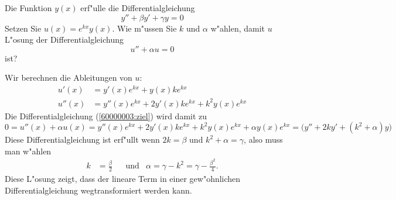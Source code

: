 Die Funktion $y(x)$ erf"ulle die Differentialgleichung
\begin{equation}
y''+\beta y' + \gamma y=0
\label{60000003:vorgabe}
\end{equation}
Setzen Sie $u(x)=e^{k x}y(x)$.
Wie m"ussen Sie $k$ und $\alpha$ w"ahlen, damit $u$ L"osung der
Differentialgleichung
\begin{equation}
u''+\alpha u=0
\label{60000003:ziel}
\end{equation}
ist?

\begin{loesung}
Wir berechnen die Ableitungen von $u$:
\begin{align*}
u'(x)&=y'(x)e^{kx}+y(x)ke^{kx}\\
u''(x)&=y''(x)e^{kx}+2y'(x)ke^{kx}+k^2y(x)e^{kx}
\end{align*}
Die Differentialgleichung  (\ref{60000003:ziel}) wird damit
zu
\[
0
=
u''(x)+\alpha u(x)
=
y''(x)e^{kx}+2y'(x)ke^{kx}+k^2y(x)e^{kx}
+ \alpha y(x)e^{kx}
=
\bigl(
y''+2k y' +(k^2+\alpha)y
\bigr)
\]
Diese Differentialgleichung ist erf"ullt wenn $2k=\beta$ und
$k^2+\alpha=\gamma$, also muss man w"ahlen
\[
\begin{aligned}
k&=\frac{\beta}2
&
&\text{und}&
\alpha=\gamma-k^2=\gamma-\frac{\beta^2}4.
\end{aligned}
\]
Diese L"osung zeigt, dass der lineare Term in einer gew"ohnlichen
Differentialgleichung wegtransformiert werden kann.
\end{loesung}

